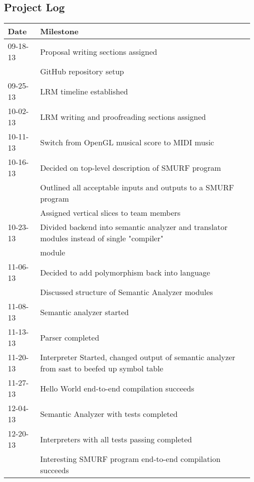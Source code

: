 	\subsection{Project Log}
		\begin{table}[htdp]
		\begin{tabular}{|l|l|}
		\hline
		Date & Milestone \\ 
		\hline
		09-18-13 & Proposal writing sections assigned \\
						& GitHub repository setup \\
		09-25-13 & LRM timeline established \\
		10-02-13 & LRM writing and proofreading sections assigned \\
		10-11-13 & Switch from OpenGL musical score to MIDI music \\
		10-16-13 & Decided on top-level description of SMURF program \\
						& Outlined all acceptable inputs and outputs to a SMURF program \\
						& Assigned vertical slices to team members \\
		10-23-13 & Divided backend into semantic analyzer and translator modules  instead of single "compiler" \\
						& module \\
		11-06-13 & Decided to add polymorphism back into language \\
	   					& Discussed structure of Semantic Analyzer modules \\
		11-08-13 & Semantic analyzer started \\
		11-13-13 & Parser completed \\ 
		11-20-13 & Interpreter Started, changed output of semantic analyzer from sast to beefed up symbol table \\
		11-27-13 & Hello World end-to-end compilation succeeds \\
		12-04-13 & Semantic Analyzer with tests completed \\
		12-20-13 & Interpreters with all tests passing completed \\
		 				& Interesting SMURF program end-to-end compilation succeeds \\
		\hline
		\end{tabular}
		\end{table}
	
